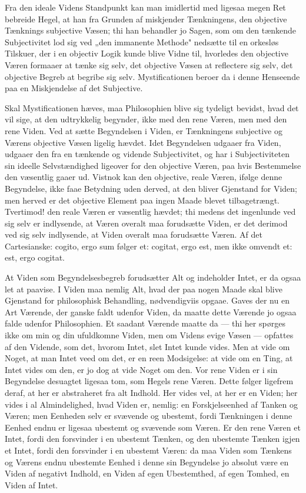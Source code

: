\documentclass[12pt]{book}
\newcommand{\opage}[1]{\marginnote{\footnotesize\textit{[#1]}}}
\begin{document}
Fra den ideale Videns Standpunkt kan man imidlertid med ligesaa megen Ret bebreide
Hegel, at han fra Grunden af miskjender Tænkningens, den objective Tænknings
subjective Væsen; thi han behandler jo Sagen, som om den tænkende
\opage{4} Subjectivitet lod sig ved „den immanente Methode" nedsætte til en orkesløs Tilskuer,
der i en objectiv Logik kunde blive Vidne til, hvorledes den objective Væren
formaaer at tænke sig selv, det objective Væsen at reflectere sig selv, det objective
Begreb at begribe sig selv. Mystificationen beroer da i denne Henseende paa en
Miskjendelse af det Subjective.

Skal Mystificationen hæves, maa Philosophien blive sig tydeligt bevidst, hvad det
vil sige, at den udtrykkelig begynder, ikke med den rene Væren, men med den rene
Viden. Ved at sætte Begyndelsen i Viden, er Tænkningens subjective og Værens
objective Væsen ligelig hævdet. Idet Begyndelsen udgaaer fra Viden, udgaaer den fra
en tænkende og vidende Subjectivitet, og har i Subjectiviteten sin ideelle
Selvstændighed ligeover for den objective Væren, paa hvis Bestemmelse den væsentlig
gaaer ud. Vistnok kan den objective, reale Væren, ifølge denne Begyndelse, ikke faae
Betydning uden derved, at den bliver Gjenstand for Viden; men herved er det objective
Element paa ingen Maade blevet tilbagetrængt. Tvertimod! den reale Væren er væsentlig
hævdet; thi medens det ingenlunde ved sig selv er indlysende, at Væren overalt maa
forudsætte Viden, er det derimod ved sig selv indlysende, at Viden overalt maa
forudsætte Væren. Af det Cartesianske: cogito, ergo sum følger et: cogitat, ergo
est, men ikke omvendt et: est, ergo cogitat.

At Viden som Begyndelsesbegreb forudsætter Alt og indeholder Intet, er da ogsaa let
at paavise. I Viden maa nemlig Alt, hvad der paa nogen Maade skal blive Gjenstand
for philosophisk Behandling, nødvendigviis opgaae. Gaves der nu en Art Værende, der
ganske faldt udenfor Viden, da maatte dette Værende jo ogsaa falde udenfor
Philosophien. Et saadant Værende maatte da --- thi her spørges ikke om min og din
ufuldkomne Viden, men om Videns evige Væsen --- opfattes af den Vidende, som det,
hvorom Intet, slet Intet kunde vides. Men at vide om Noget, at man Intet veed
\opage{5} om det, er en reen Modsigelse: at vide om en Ting, at Intet vides om den, er jo dog
at vide Noget om den. Vor rene Viden er i sin Begyndelse desuagtet ligesaa tom, som
Hegels rene Væren. Dette følger ligefrem deraf, at her er abstraheret fra alt
Indhold. Her vides vel, at her er en Viden; her vides i al Almindelighed, hvad Viden
er, nemlig: en Forskjelseenhed af Tanken og Væren; men Eenheden selv er svævende og
ubestemt, fordi Tænkningen i denne Eenhed endnu er ligesaa ubestemt og svævende som
Væren. Er den rene Væren et Intet, fordi den forsvinder i en ubestemt Tænken, og den
ubestemte Tænken igjen et Intet, fordi den forsvinder i en ubestemt Væren: da maa
Viden som Tænkens og Værens endnu ubestemte Eenhed i denne sin Begyndelse jo absolut
være en Viden af negativt Indhold, en Viden af egen Ubestemthed, af egen Tomhed, en
Viden af Intet.
\end{document}
